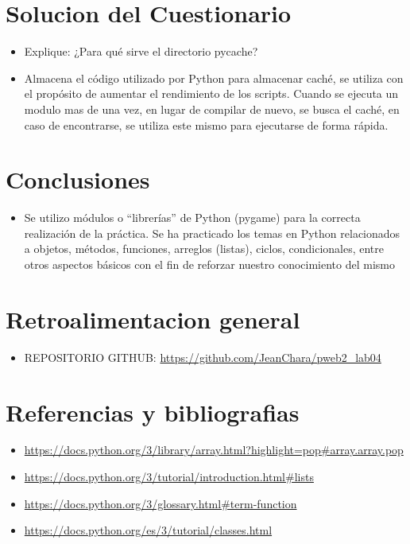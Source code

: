 \documentclass[]{article}
\begin{document}
    \section{Solucion del Cuestionario}
    	\begin{itemize}		
    		\item Explique: ¿Para qué sirve el directorio pycache?
    		\item Almacena el código utilizado por Python para almacenar caché, se utiliza con el propósito de
            aumentar el rendimiento de los scripts.
            Cuando se ejecuta un modulo mas de una vez, en lugar de compilar de nuevo, se busca el caché, en
            caso de encontrarse, se utiliza este mismo para ejecutarse  de forma rápida. 
    	\end{itemize}
    \section{Conclusiones}
    	\begin{itemize}		
    		\item Se utilizo módulos o “librerías” de Python (pygame) para la correcta realización de la práctica. Se ha practicado los temas en Python relacionados a objetos, métodos, funciones, arreglos (listas), ciclos, condicionales, entre otros aspectos básicos con el fin de reforzar nuestro conocimiento del mismo
    	\end{itemize}
    \section{Retroalimentacion general}
    	\begin{itemize}		
    		\item REPOSITORIO GITHUB: \url{https://github.com/JeanChara/pweb2_lab04}
    	\end{itemize}
    \section{Referencias y bibliografias}
    	\begin{itemize}		
    		\item \url{https://docs.python.org/3/library/array.html?highlight=pop#array.array.pop}
    		\item \url{https://docs.python.org/3/tutorial/introduction.html#lists}
    		\item \url{https://docs.python.org/3/glossary.html#term-function}
            \item \url{https://docs.python.org/es/3/tutorial/classes.html}
    	\end{itemize}
     
\end{document}
